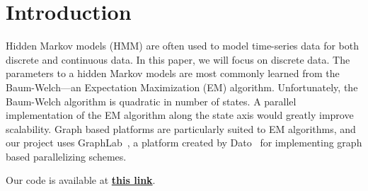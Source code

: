 \section{Introduction}

Hidden Markov models (HMM) are often used to model time-series data for both
discrete and continuous data. In this paper, we will focus on discrete data. The
parameters to a hidden Markov models are most commonly learned from the
Baum-Welch---an Expectation Maximization (EM) algorithm. Unfortunately, the
Baum-Welch algorithm is quadratic in number of states. A parallel implementation
of the EM algorithm along the state axis would greatly improve scalability.
Graph based platforms are particularly suited to EM algorithms, and our project
uses GraphLab~\cite{graphlab}, a platform created by Dato~\cite{dato} for implementing graph based parallelizing schemes. 

Our code is available at
\textbf{\href{https://github.com/cs205-project-group/hmm}{this link}}.

